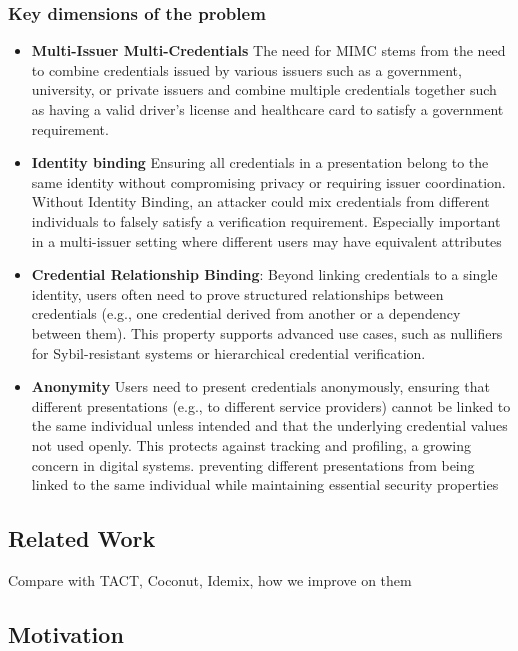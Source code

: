 \subsubsection{Key dimensions of the problem}
\begin{itemize}
    \item \textbf{Multi-Issuer Multi-Credentials} The need for MIMC stems from the need to combine credentials issued by various issuers such as a government, university, or private issuers and combine multiple credentials together such as having a valid driver's license and healthcare card to satisfy a government requirement. 

    \item \textbf{Identity binding} Ensuring all credentials in a presentation belong to the same identity without compromising privacy or requiring issuer coordination. Without Identity Binding, an attacker could mix credentials from different individuals to falsely satisfy a verification requirement. Especially important in a multi-issuer setting where different users may have equivalent attributes 

    \item \textbf{Credential Relationship Binding}: Beyond linking credentials to a single identity, users often need to prove structured relationships between credentials (e.g., one credential derived from another or a dependency between them). This property supports advanced use cases, such as nullifiers for Sybil-resistant systems or hierarchical credential verification.

    \item \textbf{Anonymity} Users need to present credentials anonymously, ensuring that different presentations (e.g., to different service providers) cannot be linked to the same individual unless intended and that the underlying credential values not used openly. This protects against tracking and profiling, a growing concern in digital systems. preventing different presentations from being linked to the same individual while maintaining essential security properties


\end{itemize}

\subsection{Related Work}
Compare with TACT, Coconut, Idemix, how we improve on them

\subsection{Motivation}



